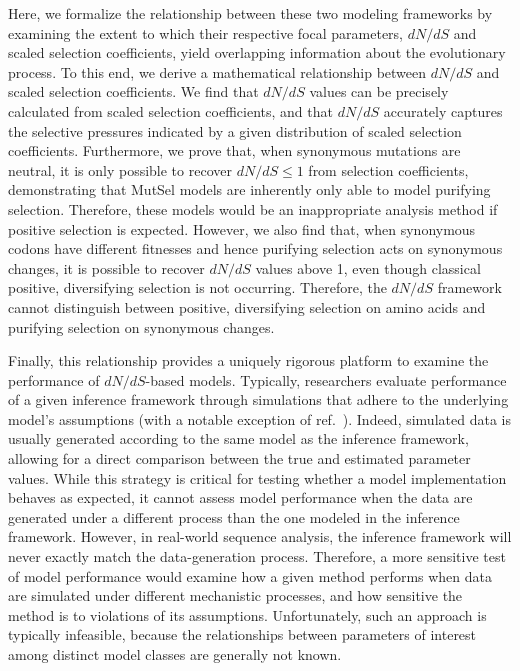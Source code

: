 \documentclass[11pt]{article}
\begin{document}
Here, we formalize the relationship between these two modeling frameworks by examining the extent to which their respective focal parameters, $dN/dS$ and scaled selection coefficients, yield overlapping information about the evolutionary process. To this end, we derive a mathematical relationship between $dN/dS$ and scaled selection coefficients. We find that $dN/dS$ values can be precisely calculated from scaled selection coefficients, and that $dN/dS$ accurately captures the selective pressures indicated by a given distribution of scaled selection coefficients. Furthermore, we prove that, when synonymous mutations are neutral, it is only possible to recover $dN/dS \leq 1$ from selection coefficients, demonstrating that MutSel models are inherently only able to model purifying selection. Therefore, these models would be an inappropriate analysis method if positive selection is expected. However, we also find that, when synonymous codons have different fitnesses and hence purifying selection acts on synonymous changes, it is possible to recover $dN/dS$ values above 1, even though classical positive, diversifying selection is not occurring. Therefore, the $dN/dS$ framework cannot distinguish between positive, diversifying selection on amino acids and purifying selection on synonymous changes.

Finally, this relationship provides a uniquely rigorous platform to examine the performance of $dN/dS$-based models. Typically, researchers evaluate performance of a given inference framework through simulations that adhere to the underlying model's assumptions (with a notable exception of ref.\ \citep{Holder2008}). Indeed, simulated data is usually generated according to the same model as the inference framework, allowing for a direct comparison between the true and estimated parameter values. While this strategy is critical for testing whether a model implementation behaves as expected, it cannot assess model performance when the data are generated under a different process than the one modeled in the inference framework. However, in real-world sequence analysis, the inference framework will never exactly match the data-generation process. Therefore, a more sensitive test of model performance would examine how a given method performs when data are simulated under different mechanistic processes, and how sensitive the method is to violations of its assumptions. Unfortunately, such an approach is typically infeasible, because the relationships between parameters of interest among distinct model classes are generally not known.
\end{document}
